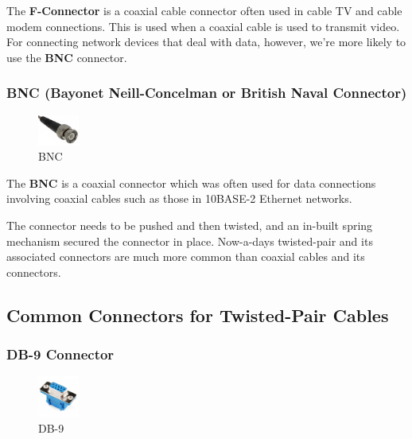 The \textbf{F-Connector} is a coaxial cable connector often used in cable TV and cable modem connections. This is used when a coaxial cable is used to transmit video. For connecting network devices that deal with data, however, we're more likely to use the \textbf{BNC} connector. 

\subsubsection{BNC (Bayonet Neill-Concelman or British Naval Connector)}
\vspace{-10pt}
\begin{figure}
	\centering
	\vspace{-12pt}
	\includegraphics[width=0.12\textwidth]{"Mod1/chapters/1.4.g BNC-Connector"}
	\caption{\label{fig:bnc_con}BNC}
	\vspace{-15pt}
\end{figure}
The \textbf{BNC} is a coaxial connector which was often used for data connections involving coaxial cables such as those in 10BASE-2 Ethernet networks. 

The connector needs to be pushed and then twisted, and an in-built spring mechanism secured the connector in place. Now-a-days twisted-pair and its associated connectors are much more common than coaxial cables and its connectors. 

\subsection{Common Connectors for Twisted-Pair Cables}
\subsubsection{DB-9 Connector}
\vspace{-10pt}
\begin{figure}
	\centering
	\vspace{-12pt}
	\includegraphics[width=0.12\textwidth]{"Mod1/chapters/1.4.h DB-9 Connector"}
	\caption{\label{fig:db9_con}DB-9}
	\vspace{-15pt}
\end{figure}

